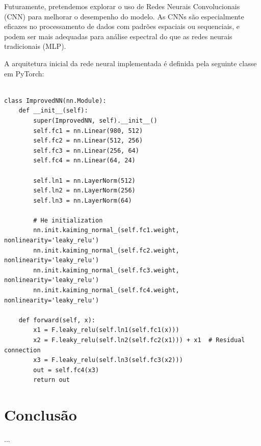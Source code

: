 \documentclass[11pt,a4paper]{article}
\begin{document}
Futuramente, pretendemos explorar o uso de Redes Neurais Convolucionais (CNN) para melhorar o desempenho do modelo. As CNNs são especialmente eficazes no processamento de dados com padrões espaciais ou sequenciais, e podem ser mais adequadas para análise espectral do que as redes neurais tradicionais (MLP). 


A arquitetura inicial da rede neural implementada é definida pela seguinte classe em PyTorch:

\begin{verbatim}

class ImprovedNN(nn.Module):
    def __init__(self):
        super(ImprovedNN, self).__init__()
        self.fc1 = nn.Linear(980, 512)
        self.fc2 = nn.Linear(512, 256) 
        self.fc3 = nn.Linear(256, 64)
        self.fc4 = nn.Linear(64, 24)
        
        self.ln1 = nn.LayerNorm(512)
        self.ln2 = nn.LayerNorm(256)
        self.ln3 = nn.LayerNorm(64)
        
        # He initialization
        nn.init.kaiming_normal_(self.fc1.weight, nonlinearity='leaky_relu')
        nn.init.kaiming_normal_(self.fc2.weight, nonlinearity='leaky_relu')
        nn.init.kaiming_normal_(self.fc3.weight, nonlinearity='leaky_relu')
        nn.init.kaiming_normal_(self.fc4.weight, nonlinearity='leaky_relu')

    def forward(self, x):
        x1 = F.leaky_relu(self.ln1(self.fc1(x)))
        x2 = F.leaky_relu(self.ln2(self.fc2(x1))) + x1  # Residual connection
        x3 = F.leaky_relu(self.ln3(self.fc3(x2)))
        out = self.fc4(x3)
        return out
\end{verbatim}




\section{Conclusão}

...

% 
% 
\end{document}

